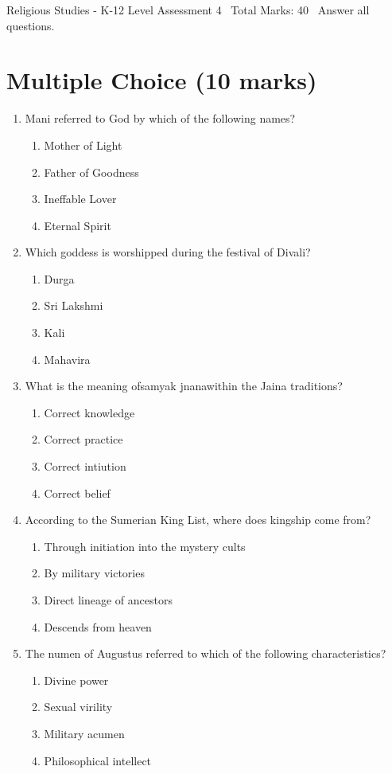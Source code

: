 \documentclass[12pt]{article}
\begin{document}
\begin{center}
Religious Studies - K-12 Level Assessment 4 \
Total Marks: 40 \
Answer all questions.
\end{center}

\section*{Multiple Choice (10 marks)}
\begin{enumerate}[label=\arabic*.]
\item Mani referred to God by which of the following names?
\begin{enumerate}[label=(\alph*)]
    \item Mother of Light
    \item Father of Goodness
    \item Ineffable Lover
    \item Eternal Spirit
\end{enumerate}
\item Which goddess is worshipped during the festival of Divali?
\begin{enumerate}[label=(\alph*)]
    \item Durga
    \item Sri Lakshmi
    \item Kali
    \item Mahavira
\end{enumerate}
\item What is the meaning ofsamyak jnanawithin the Jaina traditions?
\begin{enumerate}[label=(\alph*)]
    \item Correct knowledge
    \item Correct practice
    \item Correct intiution
    \item Correct belief
\end{enumerate}
\item According to the Sumerian King List, where does kingship come from?
\begin{enumerate}[label=(\alph*)]
    \item Through initiation into the mystery cults
    \item By military victories
    \item Direct lineage of ancestors
    \item Descends from heaven
\end{enumerate}
\item The numen of Augustus referred to which of the following characteristics?
\begin{enumerate}[label=(\alph*)]
    \item Divine power
    \item Sexual virility
    \item Military acumen
    \item Philosophical intellect
\end{enumerate}
\end{enumerate}
\end{document}

